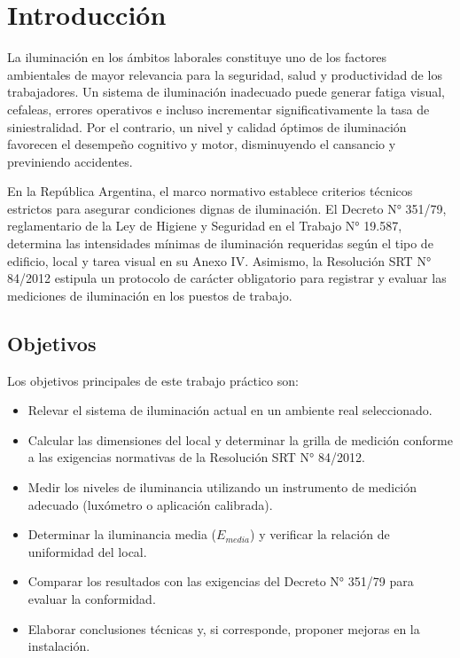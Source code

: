 \chapter{Introducción}
\label{sec.tp2:introduccion}

La iluminación en los ámbitos laborales constituye uno de los factores ambientales de mayor relevancia para la
seguridad, salud y productividad de los trabajadores. Un sistema de iluminación inadecuado puede generar fatiga visual,
cefaleas, errores operativos e incluso incrementar significativamente la tasa de siniestralidad. Por el contrario, un
nivel y calidad óptimos de iluminación favorecen el desempeño cognitivo y motor, disminuyendo el cansancio y previniendo
accidentes.

En la República Argentina, el marco normativo establece criterios técnicos estrictos para asegurar condiciones dignas
de iluminación. El Decreto N° 351/79, reglamentario de la Ley de Higiene y Seguridad en el Trabajo N° 19.587,
determina las intensidades mínimas de iluminación requeridas según el tipo de edificio, local y tarea visual en su
Anexo IV. Asimismo, la Resolución SRT N° 84/2012 estipula un protocolo de carácter obligatorio para registrar y evaluar
las mediciones de iluminación en los puestos de trabajo.

\section{Objetivos}
\label{sec.tp2:objetivos}

Los objetivos principales de este trabajo práctico son:
\begin{itemize}
    \item Relevar el sistema de iluminación actual en un ambiente real seleccionado.
    \item Calcular las dimensiones del local y determinar la grilla de medición conforme a las exigencias normativas de la Resolución SRT N° 84/2012.
    \item Medir los niveles de iluminancia utilizando un instrumento de medición adecuado (luxómetro o aplicación calibrada).
    \item Determinar la iluminancia media ($E_{media}$) y verificar la relación de uniformidad del local.
    \item Comparar los resultados con las exigencias del Decreto N° 351/79 para evaluar la conformidad.
    \item Elaborar conclusiones técnicas y, si corresponde, proponer mejoras en la instalación.
\end{itemize}

